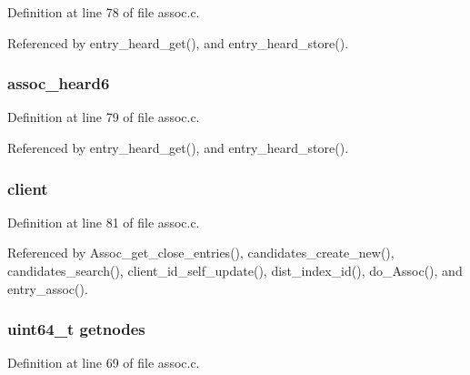 Definition at line 78 of file assoc.\+c.



Referenced by entry\+\_\+heard\+\_\+get(), and entry\+\_\+heard\+\_\+store().

\hypertarget{struct_client__entry_ae6c8f7476cc280c4f1ef1ea4799e728e}{
\subsubsection[{assoc\+\_\+heard6}]{ assoc\+\_\+heard6}}\label{struct_client__entry_ae6c8f7476cc280c4f1ef1ea4799e728e}


Definition at line 79 of file assoc.\+c.



Referenced by entry\+\_\+heard\+\_\+get(), and entry\+\_\+heard\+\_\+store().

\hypertarget{struct_client__entry_a114cded03654e9d27771e24fa1712e39}{
\subsubsection[{client}]{ client}}\label{struct_client__entry_a114cded03654e9d27771e24fa1712e39}


Definition at line 81 of file assoc.\+c.



Referenced by Assoc\+\_\+get\+\_\+close\+\_\+entries(), candidates\+\_\+create\+\_\+new(), candidates\+\_\+search(), client\+\_\+id\+\_\+self\+\_\+update(), dist\+\_\+index\+\_\+id(), do\+\_\+\+Assoc(), and entry\+\_\+assoc().

\hypertarget{struct_client__entry_aec732782691c39a31d8c579a79a8fed2}{
\subsubsection[{getnodes}]{\setlength{\rightskip}{0pt plus 5cm}uint64\+\_\+t getnodes}}\label{struct_client__entry_aec732782691c39a31d8c579a79a8fed2}


Definition at line 69 of file assoc.\+c.




